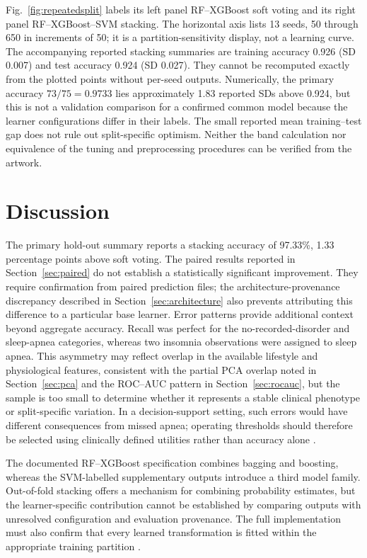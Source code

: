 \documentclass[a4paper,fleqn]{cas-dc}
\begin{document}
Fig.~\ref{fig:repeatedsplit} labels its left panel RF--XGBoost soft voting and its right panel RF--XGBoost--SVM stacking. The horizontal axis lists 13 seeds, 50 through 650 in increments of 50; it is a partition-sensitivity display, not a learning curve. The accompanying reported stacking summaries are training accuracy 0.926 (SD 0.007) and test accuracy 0.924 (SD 0.027). They cannot be recomputed exactly from the plotted points without per-seed outputs. Numerically, the primary accuracy $73/75=0.9733$ lies approximately 1.83 reported SDs above 0.924, but this is not a validation comparison for a confirmed common model because the learner configurations differ in their labels. The small reported mean training--test gap does not rule out split-specific optimism. Neither the band calculation nor equivalence of the tuning and preprocessing procedures can be verified from the artwork.



\FloatBarrier
\section{Discussion}
\label{sec:discussion}
The primary hold-out summary reports a stacking accuracy of 97.33\%, 1.33 percentage points above soft voting. The paired results reported in Section~\ref{sec:paired} do not establish a statistically significant improvement. They require confirmation from paired prediction files; the architecture-provenance discrepancy described in Section~\ref{sec:architecture} also prevents attributing this difference to a particular base learner. Error patterns provide additional context beyond aggregate accuracy. Recall was perfect for the no-recorded-disorder and sleep-apnea categories, whereas two insomnia observations were assigned to sleep apnea. This asymmetry may reflect overlap in the available lifestyle and physiological features, consistent with the partial PCA overlap noted in Section~\ref{sec:pca} and the ROC--AUC pattern in Section~\ref{sec:rocauc}, but the sample is too small to determine whether it represents a stable clinical phenotype or split-specific variation. In a decision-support setting, such errors would have different consequences from missed apnea; operating thresholds should therefore be selected using clinically defined utilities rather than accuracy alone \cite{riley2024,futureai2025}.

The documented RF--XGBoost specification combines bagging and boosting, whereas the SVM-labelled supplementary outputs introduce a third model family. Out-of-fold stacking offers a mechanism for combining probability estimates, but the learner-specific contribution cannot be established by comparing outputs with unresolved configuration and evaluation provenance. The full implementation must also confirm that every learned transformation is fitted within the appropriate training partition \cite{borisov2024,kapoor2023}.
\end{document}
